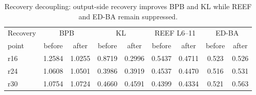 \begin{table}[t]
\centering
\caption{Recovery decoupling: output-side recovery improves BPB and KL while REEF and ED-BA remain suppressed.}
\label{tab:recovery_decoupling}
\small
\begin{tabular}{lcccccccc}
\toprule
Recovery & \multicolumn{2}{c}{BPB} & \multicolumn{2}{c}{KL} & \multicolumn{2}{c}{REEF L6--11} & \multicolumn{2}{c}{ED-BA} \\
point & before & after & before & after & before & after & before & after \\
\midrule
  r16 & 1.2584 & 1.0255 & 0.8719 & 0.2996 & 0.5437 & 0.4711 & 0.523 & 0.526 \\
  r24 & 1.0608 & 1.0501 & 0.3986 & 0.3919 & 0.4537 & 0.4470 & 0.516 & 0.531 \\
  r30 & 1.0754 & 1.0724 & 0.4660 & 0.4591 & 0.4399 & 0.4334 & 0.521 & 0.563 \\
\bottomrule
\end{tabular}
\end{table}